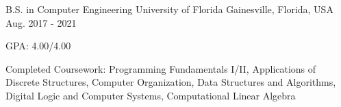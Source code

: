 

\begin{cventries}

  \cventry
    {B.S. in Computer Engineering} %
    {University of Florida} %
    {Gainesville, Florida, USA} %
    {Aug. 2017 - 2021} %
    {
      \begin{cvitems} %
        \item {GPA: 4.00/4.00}
        \item {Completed Coursework: Programming Fundamentals I/II, Applications of Discrete Structures, Computer Organization, Data Structures and Algorithms, Digital Logic and Computer Systems, Computational Linear Algebra}
      \end{cvitems}
    }

\end{cventries}
